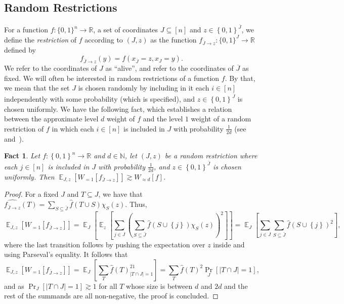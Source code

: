 \documentclass[10pt]{article}
\newcommand{\card}[1]{\left\lvert #1\right\rvert}
\newcommand{\set}[1]{{\left\{#1\right\}}}
\newcommand{\Prob}[2]{{\Pr_{#1}\left[#2\right]}}
\newcommand{\Expect}[2]{{\mathop{\mathbb E}_{#1}\left[#2\right]}}
\newcommand{\power}[1]{\set{0,1}^{#1}}
\renewcommand{\gg}{\gtrsim}
\newtheorem{fact}[thm]{Fact}
\begin{document}
\subsection{Random Restrictions}
For a function $f\colon\{0,1\}^n\to\mathbb{R}$, a set of coordinates $J\subseteq[n]$ and $z\in\power{\overline{J}}$, we define the
\emph{restriction} of
$f$ according to $(J,z)$ as the function $f_{\overline{J}\rightarrow z}\colon \{0,1\}^{J}\to\mathbb{R}$ defined by
\[
f_{\overline{J}\rightarrow z}(y) = f(x_{\overline{J}} = z, x_{J} = y).
\]
We refer to the coordinates of $J$ as ``alive'', and refer to the coordinates of $\overline{J}$ as fixed.
We will often be interested in random restrictions of a function $f$. By that, we mean that the set $J$ is chosen randomly by including in it each
$i\in[n]$ independently with some probability (which is specified), and $z\in\power{\overline{J}}$ is chosen uniformly.
We have the following fact, which establishes a relation between
the approximate level $d$ weight of $f$ and the level $1$ weight of a random restriction of $f$ in which each $i\in [n]$ is included in $J$ with probability
$\frac{1}{2d}$ (see~\cite[Fact 4.1]{kindler2018gaussian} and~\cite[Section 3.1]{KKKMS}).
\begin{fact}\label{fact:restriction}
  Let $f\colon\power{n}\to\mathbb{R}$ and $d\in\mathbb{N}$, let $(J,z)$ be a random restriction
  where each $j\in [n]$ is included in $J$ with probability $\frac{1}{2d}$, and $z\in\power{\bar{J}}$ is chosen uniformly. Then $\Expect{J,z}{W_{=1}[f_{\bar{J}\rightarrow z}]}\gg W_{\approx d}[f]$.
\end{fact}
\begin{proof}
  For a fixed $J$ and $T\subseteq J$, we have that
  $\widehat{f_{\bar{J}\rightarrow z}}(T) = \sum\limits_{S\subseteq \bar{J}}\widehat{f}(T\cup S)\chi_S(z)$. Thus,
  \[
  \Expect{J,z}{W_{=1}[f_{\bar{J}\rightarrow z}]}
  =\Expect{J}{\Expect{z}{\sum\limits_{j\in J}\left(\sum\limits_{S\subseteq\bar{J}}\widehat{f}(S\cup \set{j})\chi_S(z)\right)^2}}
  =\Expect{J}{\sum\limits_{j\in J}\sum\limits_{S\subseteq\bar{J}}\widehat{f}(S\cup \set{j})^2},
  \]
  where the last transition follows by pushing the expectation over $z$ inside and using Parseval's equality. It follows that
  \[
  \Expect{J,z}{W_{=1}[f_{\bar{J}\rightarrow z}]} =
  \Expect{J}{\sum\limits_{T}\widehat{f}(T)^21_{\card{T\cap J} = 1}}
  =\sum\limits_{T}\widehat{f}(T)^2\Prob{J}{\card{T\cap J}=1},
  \]
  and as $\Prob{J}{\card{T\cap J}=1}\gg 1$ for all $T$ whose size is between $d$ and $2d$ and the rest of the summands
  are all non-negative, the proof is concluded.
\end{proof}
\end{document}
